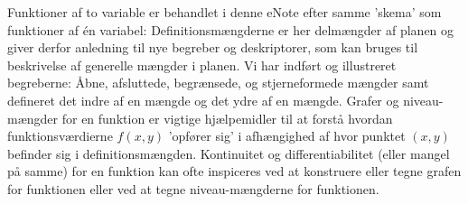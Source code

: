 
\begin{summary}
Funktioner af to variable er behandlet i denne eNote efter samme 'skema' som funktioner af \'{e}n variabel:
Definitionsmængderne er her delmængder af planen og giver derfor anledning til nye begreber og deskriptorer,
som kan bruges til  beskrivelse af generelle mængder i planen. Vi har indført og illustreret begreberne:
Åbne, afsluttede, begrænsede, og stjerneformede mængder samt defineret det
indre af en mængde og det ydre af en mængde. Grafer og niveau-mængder for en funktion er vigtige hjælpemidler til at
 forstå hvordan funktionsværdierne $f(x,y)$ 'opfører sig' i afhængighed af hvor punktet $(x,y)$ befinder sig i
definitionsmængden. Kontinuitet og differentiabilitet (eller mangel på samme) for en funktion kan ofte inspiceres ved at konstruere eller tegne
grafen for funktionen eller ved at tegne niveau-mængderne for funktionen.


\end{summary}

